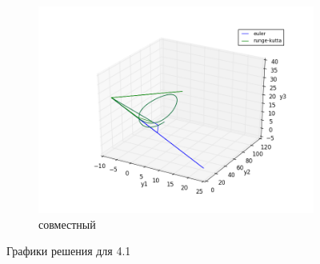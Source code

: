 \documentclass[oneside, final, 11pt]{article}
\begin{document}
\begin{figure}[h]
\begin{subfigure}[h]{1\textwidth}
        \includegraphics[width=\textwidth]{figure_1.png}
        \caption{совместный}
        \label{s2}
    \end{subfigure}
    \caption{Графики решения для 4.1}
\end{figure}
\end{document}
